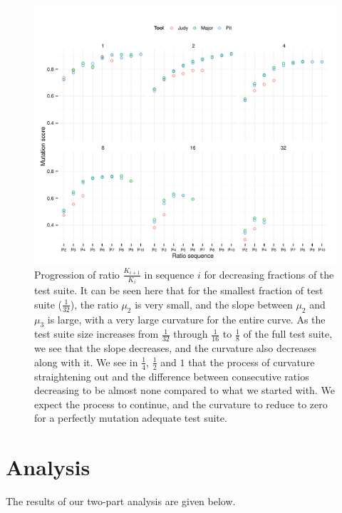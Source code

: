 \documentclass[conference]{IEEEtran}
\begin{document}
\begin{figure}[!htb]
\begin{Schunk}


{\centering \includegraphics[width=.99\linewidth]{twocolumn-unnamed-chunk-23} 

}

\end{Schunk}

\caption{Progression of ratio $\frac{K_{i+1}}{K_i}$ in sequence $i$ for decreasing fractions
of the test suite. It can be seen here that for the smallest fraction of test suite ($\frac{1}{32}$), the ratio $\mu_2$ is very small, and the slope between $\mu_2$ and $\mu_3$ is large, with a very large curvature for the entire curve. As the test suite size increases from $\frac{1}{32}$ through $\frac{1}{16}$ to $\frac{1}{8}$ of the full test suite, we see that the slope decreases, and the curvature also decreases along with it. We see in $\frac{1}{4}$, $\frac{1}{2}$ and $1$ that the process of curvature straightening out and the difference between consecutive ratios decreasing to be almost none compared to what we started with. We expect the process to continue, and the curvature to reduce to zero for a perfectly mutation adequate test suite.}
\label{fig:tcfrac}
\end{figure}


\section{Analysis}
The results of our two-part analysis are given below.
\end{document}
